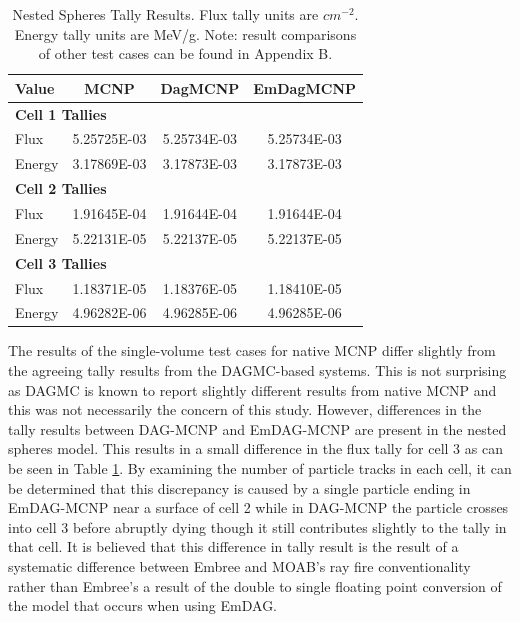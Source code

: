 \documentclass[12pt, a4paper]{article}
\begin{document}
\begin{table}[H]
  \small
  \begin{center}
    \caption{Nested Spheres Tally Results. Flux tally units are $cm^{-2}$. Energy tally units are MeV/g. Note: result comparisons of other test cases can be found in Appendix B.}
    \label{nestedspheres}
    \begin{tabular}{lccc}
      \toprule
      Value & MCNP & DagMCNP & EmDagMCNP \\
      \toprule
      \multicolumn{4}{l}{\textbf{Cell 1 Tallies}} \\
      \hline
      Flux  & 5.25725E-03 & 5.25734E-03 & 5.25734E-03 \\
      Energy  & 3.17869E-03 &  3.17873E-03 &  3.17873E-03 \\
      \hline
      \multicolumn{4}{l}{\textbf{Cell 2 Tallies}} \\
      \hline
      Flux  & 1.91645E-04 & 1.91644E-04 & 1.91644E-04 \\
      Energy  & 5.22131E-05 & 5.22137E-05 & 5.22137E-05 \\
      \hline
      \multicolumn{4}{l}{\textbf{Cell 3 Tallies}} \\
      \hline
      Flux  & 1.18371E-05 & 1.18376E-05 & 1.18410E-05 \\
      Energy  & 4.96282E-06 & 4.96285E-06 & 4.96285E-06 \\
      \bottomrule
                        
    \end{tabular}

  \end{center}
\end{table}


The results of the single-volume test cases for native MCNP differ slightly from the agreeing tally results from the DAGMC-based systems. This is not surprising as DAGMC is known to report slightly different results from native MCNP and this was not necessarily the concern of this study. However, differences in the tally results between DAG-MCNP and EmDAG-MCNP are present in the nested spheres model. This results in a small difference in the flux tally for cell 3 as can be seen in Table \ref{nestedspheres}. By examining the number of particle tracks in each cell, it can be determined that this discrepancy is caused by a single particle ending in EmDAG-MCNP near a surface of cell 2 while in DAG-MCNP the particle crosses into cell 3 before abruptly dying though it still contributes slightly to the tally in that cell. It is believed that this difference in tally result is the result of a systematic difference between Embree and MOAB's ray fire conventionality rather than Embree's a result of the double to single floating point conversion of the model that occurs when using EmDAG.
\end{document}
